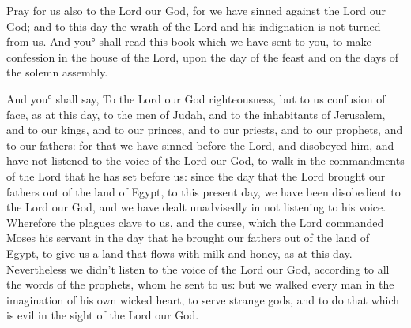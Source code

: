 {Pray for us also to the Lord our God, for we have sinned against the Lord our God; and to this day the wrath of the Lord and his indignation is not turned from us.
And you° shall read this book which we have sent to you, to make confession in the house of the Lord, upon the day of the feast and on the days of the solemn assembly.
\par }{\PP {}And you° shall say, To the Lord our God
{} righteousness, but to us confusion of face, as at this day, to the men of Judah, and to the inhabitants of Jerusalem,
and to our kings, and to our princes, and to our priests, and to our prophets, and to our fathers:
for that we have sinned before the Lord,
and disobeyed him, and have not listened to the voice of the Lord our God, to walk in the commandments of the Lord that he has set before us:
since the day that the Lord brought our fathers out of the land of Egypt, to this present day, we have been disobedient to the Lord our God, and we have dealt unadvisedly in not listening to his voice.
Wherefore the plagues clave to us, and the curse, which the Lord commanded Moses his servant
{} in the day that he brought our fathers out of the land of Egypt, to give us a land that flows with milk and honey, as at this day.
Nevertheless we didn’t listen to the voice of the Lord our God, according to all the words of the prophets, whom he sent to us:
but we walked every man in the imagination of his own wicked heart, to serve strange gods, and to do that which is evil in the sight of the Lord our God.

}
